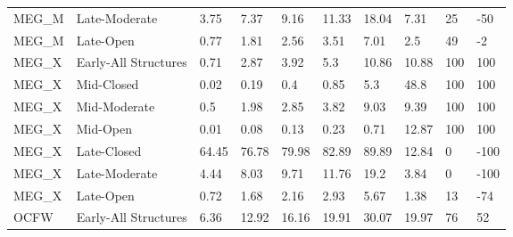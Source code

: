 \begin{sidewaystable}[!htbp]
\begin{tabular}{@{}llllllllll@{}}
\small MEG\_M          & Late-Moderate        & 3.75   & 7.37    & 9.16    & 11.33   & 18.04    & 7.31                                                      & \small 25                                                      & -50             \\
\small MEG\_M          & Late-Open            & 0.77   & 1.81    & 2.56    & 3.51    & 7.01     & 2.5                                                       & \small 49                                                      & -2              \\
\small MEG\_X          & Early-All Structures & 0.71   & 2.87    & 3.92    & 5.3     & 10.86    & 10.88                                                     & \small 100                                                     & 100             \\
\small MEG\_X          & Mid-Closed           & 0.02   & 0.19    & 0.4     & 0.85    & 5.3      & 48.8                                                      & \small 100                                                     & 100             \\
\small MEG\_X          & Mid-Moderate         & 0.5    & 1.98    & 2.85    & 3.82    & 9.03     & 9.39                                                      & \small 100                                                     & 100             \\
\small MEG\_X          & Mid-Open             & 0.01   & 0.08    & 0.13    & 0.23    & 0.71     & 12.87                                                     & \small 100                                                     & 100             \\
\small MEG\_X          & Late-Closed          & 64.45  & 76.78   & 79.98   & 82.89   & 89.89    & 12.84                                                     & \small 0                                                       & -100            \\
\small MEG\_X          & Late-Moderate        & 4.44   & 8.03    & 9.71    & 11.76   & 19.2     & 3.84                                                      & \small 0                                                       & -100            \\
\small MEG\_X          & Late-Open            & 0.72   & 1.68    & 2.16    & 2.93    & 5.67     & 1.38                                                      & \small 13                                                      & -74             \\
\small OCFW            & Early-All Structures & 6.36   & 12.92   & 16.16   & 19.91   & 30.07    & 19.97                                                     & \small 76                                                      & 52              \\

\end{tabular}
\end{sidewaystable}
